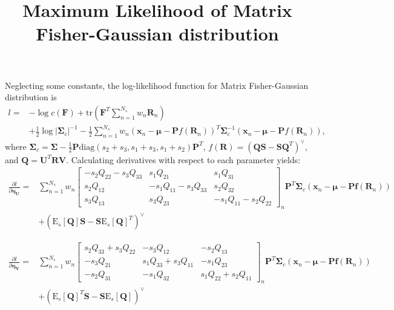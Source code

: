 \documentclass[10pt]{article}
\title{\vspace{-4ex}\textbf{Maximum Likelihood of Matrix Fisher-Gaussian distribution\vspace{-4ex}}}
\date{}
\begin{document}
\maketitle

Neglecting some constants, the log-likelihood function for Matrix Fisher-Gaussian distribution is
\begin{align}
	l = &-\log{c(\mathbf{F})} + \mathrm{tr}(\mathbf{F}^T\sum_{n=1}^{N_s}w_n\mathbf{R}_n) \nonumber \\
	&+\frac{1}{2}\log{|\mathbf{\Sigma}_c|^{-1}} - \frac{1}{2}\sum_{n=1}^{N_s}w_n\left(\bm{x}_n-\bm{\mu}-\mathbf{P}f(\mathbf{R}_n)\right)^T\mathbf{\Sigma}_c^{-1}\left(\bm{x}_n-\bm{\mu}-\mathbf{P}f(\mathbf{R}_n)\right),
\end{align}
where $\mathbf{\Sigma}_c = \mathbf{\Sigma} - \frac{1}{2}\mathbf{P}\mathrm{diag}(s_2+s_3,s_1+s_3,s_1+s_2)\mathbf{P}^T$, $f(\mathbf{R}) = (\mathbf{Q}\mathbf{S}-\mathbf{S}\mathbf{Q}^T)^\vee$, and $\mathbf{Q}=\mathbf{U}^T\mathbf{R}\mathbf{V}$.
Calculating derivatives with respect to each parameter yields:
\begin{align}
	\frac{\partial l}{\partial \bm{\eta}_\mathbf{U}} = &\sum_{n=1}^{N_s}w_n\begin{bmatrix}
		-s_2Q_{22}-s_3Q_{33} & s_1Q_{21} & s_1Q_{31} \\
		s_2Q_{12} & -s_1Q_{11}-s_3Q_{33} & s_2Q_{32} \\
		s_3Q_{13} & s_3Q_{23} & -s_1Q_{11}-s_2Q_{22}
	\end{bmatrix}_n\mathbf{P}^T\mathbf{\Sigma}_c\left(\bm{x}_n-\bm{\mu}-\mathbf{P}\bm{f}(\mathbf{R}_n)\right) \nonumber \\
	&+ \left(\mathrm{E}_s[\mathbf{Q}]\mathbf{S}-\mathbf{S}\mathrm{E}_s[\mathbf{Q}]^T\right)^\vee
\end{align}

\begin{align}
	\frac{\partial l}{\partial \bm{\eta}_\mathbf{V}} = &\sum_{n=1}^{N_s}w_n\begin{bmatrix}
		s_2Q_{33}+s_3Q_{22} & -s_3Q_{12} & -s_2Q_{13} \\
		-s_3Q_{21} & s_1Q_{33}+s_3Q_{11} & -s_1Q_{23} \\
		-s_2Q_{31} & -s_1Q_{32} & s_1Q_{22}+s_2Q_{11}
	\end{bmatrix}_n\mathbf{P}^T\mathbf{\Sigma}_c\left(\bm{x}_n-\bm{\mu}-\mathbf{P}\bm{f}(\mathbf{R}_n)\right) \nonumber \\
	&+ \left(\mathrm{E}_s[\mathbf{Q}]^T\mathbf{S}-\mathbf{S}\mathrm{E}_s[\mathbf{Q}]\right)^\vee
\end{align}
\end{document}
